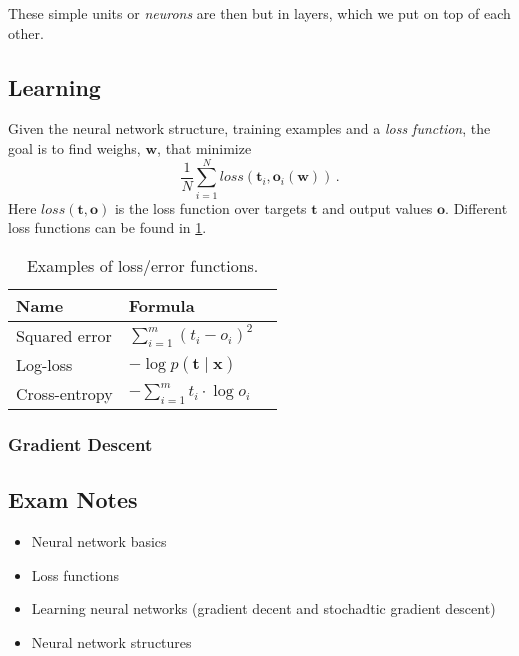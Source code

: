 These simple units or \emph{neurons} are then but in layers, which we put on top of each other.

\subsection{Learning}

Given the neural network structure, training examples and a \emph{loss function}, the goal is to find weighs, $\mathbf{w}$, that minimize
\[
    \frac 1 N \sum_{i=1}^N loss(\mathbf{t}_i, \mathbf{o}_i(\mathbf{w}))\,.
\]
Here $loss(\mathbf{t}, \mathbf{o})$ is the loss function over targets $\mathbf{t}$ and output values $\mathbf{o}$.
Different loss functions can be found in \cref{tab:loss}.

\begin{table}[h]
    \centering
    \begin{tabular}{llX}
        \toprule
        Name & Formula \\ \midrule
        Squared error & $\sum_{i=1}^m(t_i - o_i)^2$ \\
        Log-loss & $-\log p(\mathbf{t}\mid \mathbf{x})$ \\
        Cross-entropy & $-\sum_{i=1}^m t_i \cdot \log o_i$ \\
        \bottomrule
    \end{tabular}
    \caption{Examples of loss/error functions.}
    \label{tab:loss}
\end{table}

\subsubsection{Gradient Descent}

\subsection{Exam Notes}

\begin{itemize}
    \item Neural network basics
    \item Loss functions
    \item Learning neural networks (gradient decent and stochadtic gradient descent)
    \item Neural network structures
\end{itemize}

